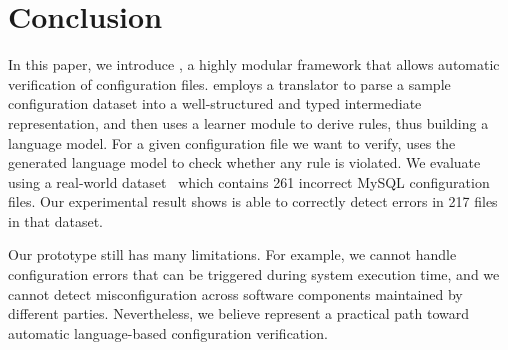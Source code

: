 
\section{Conclusion}

In this paper, we introduce \app, a highly modular framework 
that allows automatic verification of configuration files.
\app employs a translator to parse a sample configuration dataset
into a well-structured and typed intermediate representation,
and then uses a learner module to derive rules, 
thus building a language model.
For a given configuration file we want to verify,
\app uses the generated language model to check
whether any rule is violated.
We evaluate \app using a real-world dataset~\cite{configdataset}
which contains 261 incorrect MySQL configuration files.
Our experimental result shows \app is able to
correctly detect errors in 217 files in that dataset.

Our \app prototype still has many limitations. 
For example, we cannot handle configuration errors that can be 
triggered during system execution time, 
and we cannot detect misconfiguration across software components
maintained by different parties. 
Nevertheless, we believe \app represent a practical path
toward automatic language-based configuration verification.

